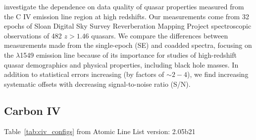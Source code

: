\documentclass[a4paper,fleqn,usenatbib]{mnras}
\begin{document}
\citet{Denney2016}
investigate the dependence on data quality of quasar properties
measured from the C IV emission line region at high redshifts.  Our
measurements come from 32 epochs of Sloan Digital Sky Survey
Reverberation Mapping Project spectroscopic observations of 482 $z >
1.46$ quasars. We compare the differences between measurements made
from the single-epoch (SE) and coadded spectra, focusing on the \civ
$\lambda$1549 emission line because of its importance for studies of
high-redshift quasar demographics and physical properties, including
black hole masses. In addition to statistical errors increasing (by
factors of $\sim2-4$), we find increasing systematic offsets with
decreasing signal-to-noise ratio (S/N).


\citet{Grier2015}



\subsection{Carbon IV}
Table~\ref{tab:civ_configs} from 
Atomic Line List version: 2.05b21  
\citep{Tunklev1997} \\

\citep[NIST; ][]{Reader2012AAS, Kramida2018}\\

%
%
% 
\end{document}

